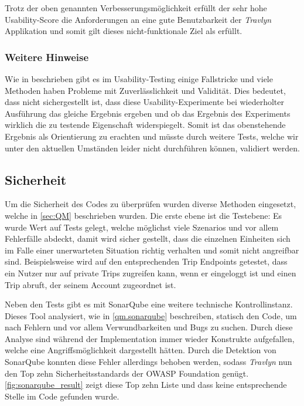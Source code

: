 	\vspace{0.25cm}
	
	Trotz der oben genannten Verbesserungsmöglichkeit erfüllt der sehr hohe Usability-Score die Anforderungen an eine gute Benutzbarkeit der \textit{Travlyn} Applikation und somit gilt dieses nicht-funktionale Ziel als erfüllt. 
	
	\subsubsection{Weitere Hinweise}
	Wie in \cite{Nielsen.20091993} beschrieben gibt es im Usability-Testing einige Fallstricke und viele Methoden haben Probleme mit Zuverlässlichkeit und Validität. Dies bedeutet, dass nicht sichergestellt ist, dass diese Usability-Experimente bei wiederholter Ausführung das gleiche Ergebnis ergeben und ob das Ergebnis des Experiments wirklich die zu testende Eigenschaft widerspiegelt. Somit ist das obenstehende Ergebnis als Orientierung zu erachten und müsste durch weitere Tests, welche wir unter den aktuellen Umständen leider nicht durchführen können, validiert werden.
	
	\subsection{Sicherheit}
	Um die Sicherheit des Codes zu überprüfen wurden diverse Methoden eingesetzt, welche in \autoref{sec:QM} beschrieben wurden. Die erste ebene ist die Testebene: Es wurde Wert auf Tests gelegt, welche möglichst viele Szenarios und vor allem Fehlerfälle abdeckt, damit wird sicher gestellt, dass die einzelnen Einheiten sich im Falle einer unerwarteten Situation richtig verhalten und somit nicht angreifbar sind. Beispielsweise wird auf den entsprechenden Trip Endpoints getestet, dass ein Nutzer nur auf private Trips zugreifen kann, wenn er eingeloggt ist und einen Trip abruft, der seinem Account zugeordnet ist.
	
	\vspace{0.25cm}
	
	Neben den Tests gibt es mit SonarQube eine weitere technische Kontrollinstanz. Dieses Tool analysiert, wie in \autoref{qm.sonarqube} beschreiben, statisch den Code, um nach Fehlern und vor allem Verwundbarkeiten und Bugs zu suchen. Durch diese Analyse sind während der Implementation immer wieder Konstrukte aufgefallen, welche eine Angriffsmöglichkeit dargestellt hätten. Durch die Detektion von SonarQube konnten diese Fehler allerdings behoben werden, sodass \textit{Travlyn} nun den Top zehn Sicherheitsstandards der OWASP Foundation \cite{OWASPFoundation.20200503T01:28:27.000Z} genügt. \autoref{fig:sonarqube_result} zeigt diese Top zehn Liste und dass keine entsprechende Stelle im Code gefunden wurde.
	
